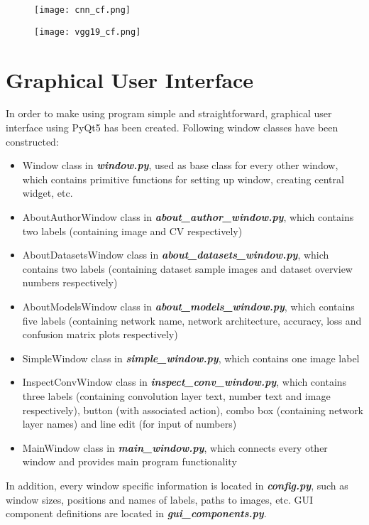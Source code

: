 \begin{figure}[h]
	\centering
	\begin{minipage}{.5\textwidth}
		\centering
		\texttt{[image: cnn\_cf.png]}
		\label{fig:cnncf}
	\end{minipage}%
	\begin{minipage}{.5\textwidth}
		\centering
		\texttt{[image: vgg19\_cf.png]}
		\label{fig:vgg19cf}
	\end{minipage}
\end{figure}

\clearpage

\section{Graphical User Interface} \label{gui}

In order to make using program simple and straightforward, graphical user interface using PyQt5 has been created. Following window classes have been constructed:
\begin{itemize}
	\itemsep 0em
	\item Window class in \textbf{\emph{window.py}}, used as base class for every other window, which contains primitive functions for setting up window, creating central widget, etc.
	\item AboutAuthorWindow class in \textbf{\emph{about\_author\_window.py}}, which contains two labels (containing image and CV respectively)
	\item AboutDatasetsWindow class in \textbf{\emph{about\_datasets\_window.py}}, which contains two labels (containing dataset sample images and dataset overview numbers respectively)
	\item AboutModelsWindow class in \textbf{\emph{about\_models\_window.py}}, which contains five labels (containing network name, network architecture, accuracy, loss and confusion matrix plots respectively)
	\item SimpleWindow class in \textbf{\emph{simple\_window.py}}, which contains one image label
	\item InspectConvWindow class in \textbf{\emph{inspect\_conv\_window.py}}, which contains three labels (containing convolution layer text, number text and image respectively), button (with associated action), combo box (containing network layer names)  and line edit (for input of numbers)
	\item MainWindow class in \textbf{\emph{main\_window.py}}, which connects every other window and provides main program functionality 
\end{itemize}
In addition, every window specific information is located in \textbf{\emph{config.py}}, such as window sizes, positions and names of labels, paths to images, etc. GUI component definitions are located in \textbf{\emph{gui\_components.py}}.

